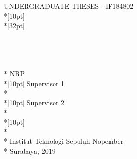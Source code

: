 \newpage
	\sffamily
	\thispagestyle{empty}
	{\noindent UNDERGRADUATE THESES - IF184802 } \\*[10pt]
	{\large\textbf{\MakeUppercase{\juduleng}}} \\*[32pt]
	\\
	\\
	\\
	\\
	\MakeUppercase{\penulis} \\*
	NRP \nrp \\*[10pt]
	Supervisor 1 \\*
	\pembimbingsatu \\*[10pt]
	Supervisor 2 \\*
	\pembimbingdua \\*[10pt]
	\MakeUppercase{\jurusaneng} \\*
	\fakultaseng \\*
	Institut Teknologi Sepuluh Nopember \\*
	Surabaya, 2019
	\rmfamily
	\normalsize
	\restoregeometry
	\color{black}
	\cleardoublepage
